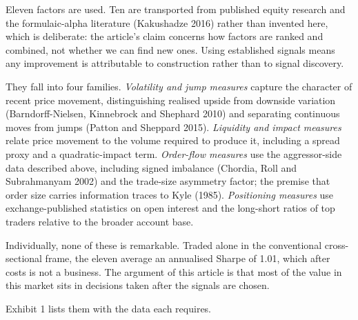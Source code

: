 \documentclass[12pt]{article}
\makeatletter
\renewcommand{\section}[1]{\par\vspace{16pt}%
  \noindent{\bfseries\MakeUppercase{#1}}\par\nobreak\vspace{4pt}%
  \@afterindenttrue\@afterheading}
\makeatother
\begin{document}
\section{The Factors}

Eleven factors are used. Ten are transported from published equity research and the
formulaic-alpha literature (Kakushadze 2016)
rather than invented here, which is deliberate: the article's claim concerns how
factors are ranked and combined, not whether we can find new ones. Using
established signals means any improvement is attributable to construction rather
than to signal discovery.

They fall into four families. \emph{Volatility and jump measures} capture the
character of recent price movement, distinguishing realised upside from downside
variation (Barndorff-Nielsen, Kinnebrock and Shephard 2010) and separating
continuous moves from jumps (Patton and Sheppard 2015). \emph{Liquidity and
impact measures} relate price movement to the volume required to produce it,
including a spread proxy and a quadratic-impact term. \emph{Order-flow measures}
use the aggressor-side data described above, including signed imbalance (Chordia, Roll and
Subrahmanyam 2002) and the
trade-size asymmetry factor; the premise that order size carries information
traces to Kyle (1985). \emph{Positioning measures} use exchange-published
statistics on open interest and the long-short ratios of top traders relative to
the broader account base.

Individually, none of these is remarkable. Traded alone in the conventional
cross-sectional frame, the eleven average an annualised Sharpe of 1.01, which
after costs is not a business. The argument of this article is that most of the
value in this market sits in decisions taken after the signals are chosen.

Exhibit 1 lists them with the data each requires.
\end{document}
